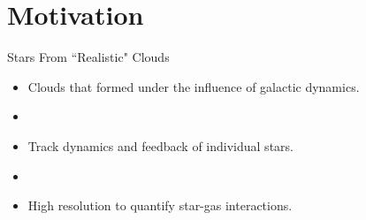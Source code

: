 \documentclass[aspectratio=169]{beamer}
\begin{document}
\section{Motivation}
%
%
%
%
\begin{frame}{Stars From ``Realistic" Clouds}{}
    \begin{itemize}
        \item Clouds that formed under the influence of galactic dynamics.
        \item []
        \item Track dynamics and feedback of individual stars.
        \item []
        \item High resolution to quantify star-gas interactions.
    \end{itemize}
\end{frame}
%
%
%
\end{document}
